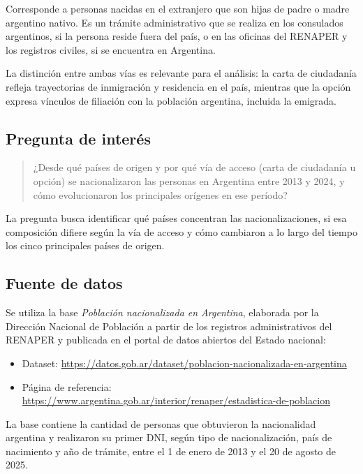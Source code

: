 \documentclass[
  letterpaper,
  DIV=11,
  numbers=noendperiod]{scrartcl}
\providecommand{\tightlist}{%
  \setlength{\itemsep}{0pt}\setlength{\parskip}{0pt}}\usepackage{longtable,booktabs,array}
\begin{document}
Corresponde a personas nacidas en el extranjero que son hijas de padre o
madre argentino nativo. Es un trámite administrativo que se realiza en
los consulados argentinos, si la persona reside fuera del país, o en las
oficinas del RENAPER y los registros civiles, si se encuentra en
Argentina.

La distinción entre ambas vías es relevante para el análisis: la carta
de ciudadanía refleja trayectorias de inmigración y residencia en el
país, mientras que la opción expresa vínculos de filiación con la
población argentina, incluida la emigrada.

\subsection{Pregunta de interés}\label{pregunta-de-interuxe9s}

\begin{quote}
¿Desde qué países de origen y por qué vía de acceso (carta de ciudadanía
u opción) se nacionalizaron las personas en Argentina entre 2013 y 2024,
y cómo evolucionaron los principales orígenes en ese período?
\end{quote}

La pregunta busca identificar qué países concentran las
nacionalizaciones, si esa composición difiere según la vía de acceso y
cómo cambiaron a lo largo del tiempo los cinco principales países de
origen.

\subsection{Fuente de datos}\label{fuente-de-datos}

Se utiliza la base \emph{Población nacionalizada en Argentina},
elaborada por la Dirección Nacional de Población a partir de los
registros administrativos del RENAPER y publicada en el portal de datos
abiertos del Estado nacional:

\begin{itemize}
\tightlist
\item
  Dataset:
  \url{https://datos.gob.ar/dataset/poblacion-nacionalizada-en-argentina}
\item
  Página de referencia:
  \url{https://www.argentina.gob.ar/interior/renaper/estadistica-de-poblacion}
\end{itemize}

La base contiene la cantidad de personas que obtuvieron la nacionalidad
argentina y realizaron su primer DNI, según tipo de nacionalización,
país de nacimiento y año de trámite, entre el 1 de enero de 2013 y el 20
de agosto de 2025.
\end{document}
